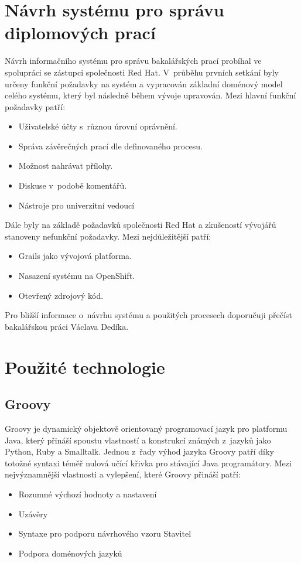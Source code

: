 \section{Návrh systému pro správu diplomových prací}
Návrh informačního systému pro správu bakalářských prací probíhal ve spolupráci se zástupci společnosti Red Hat. V~průběhu prvních setkání byly určeny funkční požadavky na systém a vypracován základní doménový model celého systému, který byl následně během vývoje upravován. Mezi hlavní funkční požadavky patří:
\begin{itemize}
\item Uživatelské účty s~různou úrovní oprávnění.
\item Správa závěrečných prací dle definovaného procesu.
\item Možnost nahrávat přílohy.
\item Diskuse v~podobě komentářů.
\item Nástroje pro univerzitní vedoucí
\end{itemize}


Dále byly na základě požadavků společnosti Red Hat a zkušeností vývojářů stanoveny nefunkční požadavky. Mezi nejdůležitější patří:
\begin{itemize}
\item Grails jako vývojová platforma.
\item Nasazení systému na OpenShift.
\item Otevřený zdrojový kód.
\end{itemize}


Pro bližší informace o~návrhu systému a použitých procesech doporučuji přečíst bakalářskou práci Václava Dedíka.

\section{Použité technologie}
\subsection{Groovy}
Groovy je dynamický objektově orientovaný programovací jazyk pro platformu Java, který přináší spoustu vlastností a konstrukcí známých z~jazyků jako Python, Ruby a Smalltalk. Jednou z~řady výhod jazyka Groovy patří díky totožné syntaxi téměř nulová učící křivka pro stávající Java programátory. Mezi nejvýznamnější vlastnosti a vylepšení, které Groovy přináší patří:

\begin{itemize}
\item Rozumné výchozí hodnoty a nastavení
\item Uzávěry
\item Syntaxe pro podporu návrhového vzoru Stavitel
\item Podpora doménových jazyků
\end{itemize}

